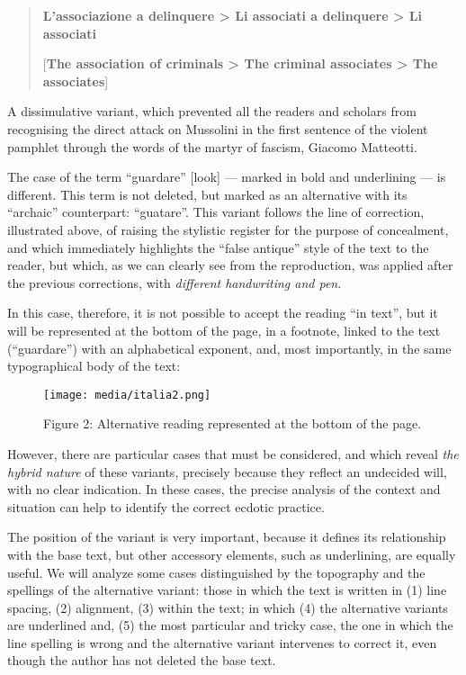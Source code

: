\documentclass{article}
\begin{document}
\begin{quote}


\textbf{L'associazione a delinquere \textgreater{} Li associati a
delinquere \textgreater{} Li associati}    

\vspace{1em}

[\textbf{The association of criminals \textgreater{} The criminal associates \textgreater{} The associates}]    
\end{quote}

\noindent A dissimulative variant, which prevented all the readers and scholars
from recognising the
direct attack on Mussolini in the first sentence of the violent pamphlet through the words of the martyr of fascism,
Giacomo Matteotti.

The case of the term ``guardare'' [look] –– marked in bold and underlining –– is
different. This term is not deleted, but marked as an alternative with
its ``archaic'' counterpart: ``guatare''. This variant
 follows the line of correction, illustrated above, of raising the
stylistic register for the purpose of concealment, and which immediately
highlights  the ``false antique'' style of the text to the reader, but which,
as we can clearly see from the reproduction, was applied after the
previous corrections, with \emph{different handwriting and pen}.

In this case, therefore, it is not possible to accept the reading ``in
text'', but it will be represented at the bottom of the page, in
a footnote, linked to the text (``guardare'') with an alphabetical
exponent, and, most importantly, in the same typographical body of the
text:

\begin{figure}[H]
    \centering
    \texttt{[image: media/italia2.png]}
    \caption{Figure 2: Alternative reading represented at the bottom of the page.}
    \label{fig:italia2}
\end{figure}

However, there are particular cases that must be considered, and which
reveal \emph{the hybrid nature} of these variants, precisely because
they reflect an undecided will, with no clear indication. In these
cases, the precise analysis of the context and situation can help to
identify the correct ecdotic practice.

The position of the variant is very important, because it defines its
relationship with the base text, but other accessory elements, such as
underlining, are equally useful. We will analyze some cases
distinguished by the topography and the spellings of the alternative
variant: those in which the text is written in (1) line spacing, (2)
alignment, (3) within the text; in which (4) the alternative variants
are underlined and, (5) the most particular and tricky case, the one in
which the line spelling is wrong and the alternative variant intervenes
to correct it, even though the author has not deleted the base text.
\end{document}
